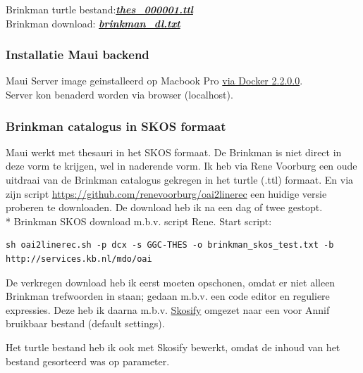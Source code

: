 \documentclass{article}
\begin{document}
\begin{shaded}
\noindent
Brinkman turtle bestand:\quad \href{run:/Users/haighton_macbook/Desktop/Projects/KB/automatisch_onderwerp_ontsluiting/scripts/data/thes_000001.ttl}{\textbf{\textit{thes\_000001.ttl}}} \\
Brinkman download: \quad \quad
\href{/Users/haighton_macbook/Desktop/Projects/KB/brinkman_skos/data/brinkman_dl.txt}{\textbf{\textit{brinkman\_dl.txt}}}

\end{shaded}

\subsubsection{Installatie Maui backend}

Maui Server image geinstalleerd op Macbook Pro \href{https://github.com/NatLibFi/MauiServer/tree/dockerization#usage-with-docker}{via Docker 2.2.0.0}. \\
Server kon benaderd worden via browser (localhost). 


\subsubsection{Brinkman catalogus in SKOS formaat}

Maui werkt met thesauri in het SKOS formaat. De Brinkman is niet direct in deze vorm te krijgen, wel in naderende vorm. Ik heb via Rene Voorburg een oude uitdraai van de Brinkman catalogus gekregen in het turtle (.ttl) formaat. En via zijn script \url{https://github.com/renevoorburg/oai2linerec} een huidige versie proberen te downloaden. De download heb ik na een dag of twee gestopt.
\\*
Brinkman SKOS download m.b.v. script Rene. Start script:
\begin{lstlisting}
sh oai2linerec.sh -p dcx -s GGC-THES -o brinkman_skos_test.txt -b http://services.kb.nl/mdo/oai
\end{lstlisting}

De verkregen download heb ik eerst moeten opschonen, omdat er niet alleen Brinkman trefwoorden in staan; gedaan m.b.v. een code editor en reguliere expressies. Deze heb ik daarna m.b.v. \href{https://github.com/NatLibFi/Skosify}{Skosify} omgezet naar een voor Annif bruikbaar bestand (default settings).

Het turtle bestand heb ik ook met Skosify bewerkt, omdat de inhoud van het bestand gesorteerd was op parameter.
\end{document}
